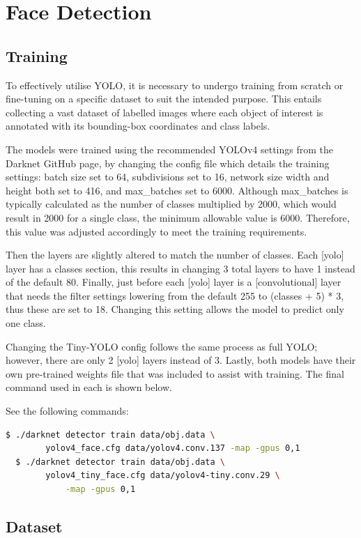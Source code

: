 \section{Face Detection}

\subsection{Training}

To effectively utilise YOLO, it is necessary to undergo training from scratch or fine-tuning on a specific dataset to suit the intended purpose. This entails collecting a vast dataset of labelled images where each object of interest is annotated with its bounding-box coordinates and class labels.

The models were trained using the recommended YOLOv4 settings from the Darknet GitHub page, by changing the config file which details the training settings: batch size set to 64, subdivisions set to 16, network size width and height both set to 416, and max\_batches set to 6000. Although max\_batches is typically calculated as the number of classes multiplied by 2000, which would result in 2000 for a single class, the minimum allowable value is 6000. Therefore, this value was adjusted accordingly to meet the training requirements.

Then the layers are slightly altered to match the number of classes. Each [yolo] layer has a classes section, this results in changing 3 total layers to have 1 instead of the default 80. Finally, just before each [yolo] layer is a [convolutional] layer that needs the filter settings lowering from the default 255 to (classes + 5) * 3, thus these are set to 18. Changing this setting allows the model to predict only one class.

Changing the Tiny-YOLO config follows the same process as full YOLO; however, there are only 2 [yolo] layers instead of 3. Lastly, both models have their own pre-trained weights file that was included to assist with training. The final command used in each is shown below.

\noindent{} See the following commands:
\begin{lstlisting}[language=bash]
  $ ./darknet detector train data/obj.data \
        yolov4_face.cfg data/yolov4.conv.137 -map -gpus 0,1
  $ ./darknet detector train data/obj.data \
        yolov4_tiny_face.cfg data/yolov4-tiny.conv.29 \
            -map -gpus 0,1
\end{lstlisting}


\subsection{Dataset}

